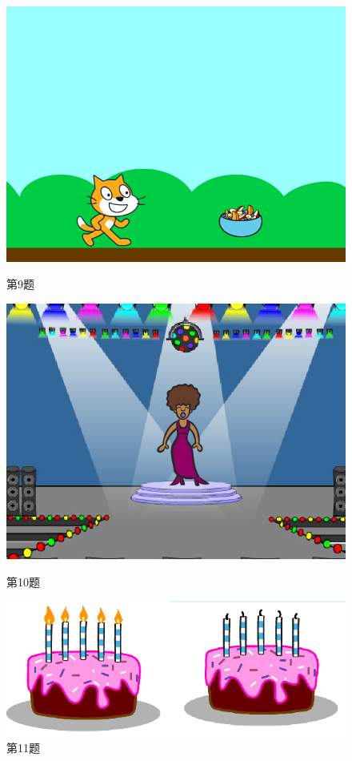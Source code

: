 \documentclass[10pt, a4paper]{article}
\begin{document}
\begin{enumerate}
\begin{figure}[htbp]
\begin{minipage}[t]{.18\textwidth}
                \centering
                \includegraphics[width=\textwidth]{9.png}
                \caption*{第9题}
            \end{minipage}
            \begin{minipage}[t]{.18\textwidth}
                \centering
                \includegraphics[width=\textwidth]{10.png}
                \caption*{第10题}
            \end{minipage}
            \begin{minipage}[t]{.3\textwidth}
                \centering
                \includegraphics[width=\textwidth]{11.png}
                \caption*{第11题}
            \end{minipage}
        \end{figure}


\end{enumerate}
\end{document}
